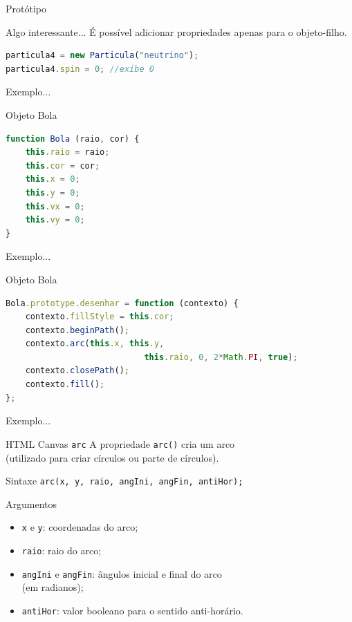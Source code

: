 \documentclass[xcolor=dvipsnames,table]{beamer}
\begin{document}
\begin{frame}[fragile]{Protótipo}
	\begin{block}{Algo interessante...}
		É possível adicionar propriedades apenas para o objeto-filho.
		\begin{lstlisting}[language=JavaScript]
particula4 = new Particula("neutrino");
particula4.spin = 0; //exibe 0
\end{lstlisting}	
	\end{block}
\end{frame}

\begin{frame}[fragile]{Exemplo...}
	\begin{block}{Objeto Bola}
		\begin{lstlisting}[language=JavaScript]
function Bola (raio, cor) {
	this.raio = raio;
	this.cor = cor;
	this.x = 0;
	this.y = 0;
	this.vx = 0;
	this.vy = 0;
}
\end{lstlisting}	
	\end{block}
\end{frame}

\begin{frame}[fragile]{Exemplo...}
	\begin{block}{Objeto Bola}
		\begin{lstlisting}[language=JavaScript]
Bola.prototype.desenhar = function (contexto) {
	contexto.fillStyle = this.cor;
	contexto.beginPath();
	contexto.arc(this.x, this.y, 
							this.raio, 0, 2*Math.PI, true);
	contexto.closePath();
	contexto.fill();
};
\end{lstlisting}	
	\end{block}
\end{frame}

\begin{frame}[fragile]{Exemplo...} 
	\begin{block}{HTML Canvas {\tt arc}}
		A propriedade {\tt arc()} cria um arco \\(utilizado para criar círculos ou parte de círculos). 
	\end{block}
	\begin{block}{Sintaxe}
		{\tt arc(x, y, raio, angIni, angFin, antiHor);}
	\end{block}
	\begin{block}{Argumentos}
		\begin{itemize}
			\item {\tt x} e {\tt y}: coordenadas do arco;
			\item {\tt raio}: raio do arco; 
			\item {\tt angIni} e {\tt angFin}: ângulos inicial e final do arco \\(em radianos);
			\item {\tt antiHor}: valor booleano para o sentido anti-horário.
		\end{itemize}
	\end{block}
\end{frame}
\end{document}
